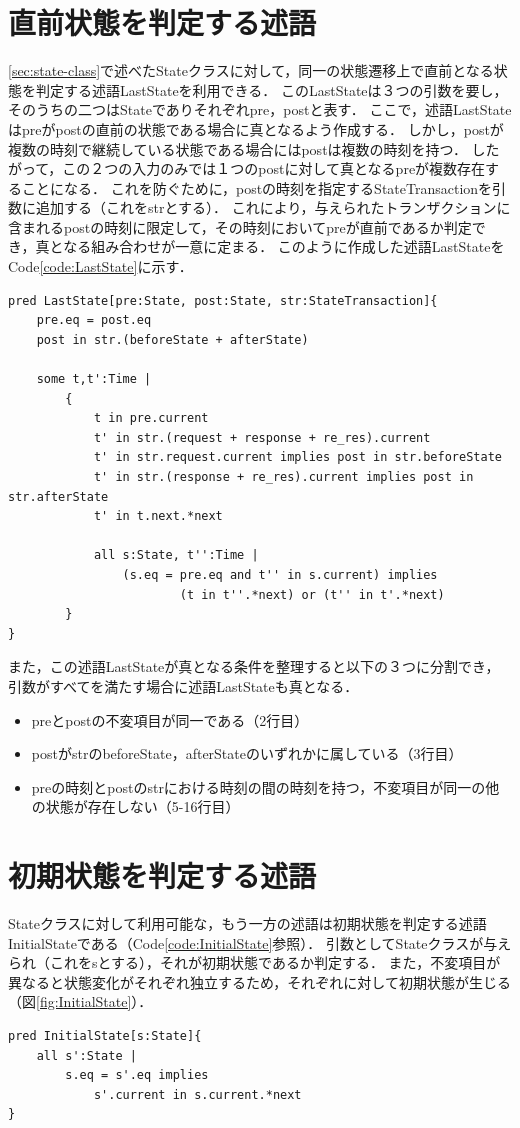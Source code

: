 \documentclass[12pt,a4paper]{jbook}
\begin{document}
\section{直前状態を判定する述語}
\ref{sec:state-class}で述べたStateクラスに対して，同一の状態遷移上で直前となる状態を判定する述語LastStateを利用できる．
このLastStateは３つの引数を要し，そのうちの二つはStateでありそれぞれpre，postと表す．
ここで，述語LastStateはpreがpostの直前の状態である場合に真となるよう作成する．
しかし，postが複数の時刻で継続している状態である場合にはpostは複数の時刻を持つ．
したがって，この２つの入力のみでは１つのpostに対して真となるpreが複数存在することになる．
これを防ぐために，postの時刻を指定するStateTransactionを引数に追加する（これをstrとする）．
これにより，与えられたトランザクションに含まれるpostの時刻に限定して，その時刻においてpreが直前であるか判定でき，真となる組み合わせが一意に定まる．
このように作成した述語LastStateをCode\ref{code:LastState}に示す．

\begin{lstlisting}[caption=状態遷移において直前の状態を判定する述語, label=code:LastState]
pred LastState[pre:State, post:State, str:StateTransaction]{
	pre.eq = post.eq
	post in str.(beforeState + afterState)

	some t,t':Time |
		{
			t in pre.current
			t' in str.(request + response + re_res).current
			t' in str.request.current implies post in str.beforeState
			t' in str.(response + re_res).current implies post in str.afterState
			t' in t.next.*next

			all s:State, t'':Time |
				(s.eq = pre.eq and t'' in s.current) implies
						(t in t''.*next) or (t'' in t'.*next)
		}
}
\end{lstlisting}

また，この述語LastStateが真となる条件を整理すると以下の３つに分割でき，引数がすべてを満たす場合に述語LastStateも真となる．
\begin{itemize}
\item preとpostの不変項目が同一である（2行目）
\item postがstrのbeforeState，afterStateのいずれかに属している（3行目）
\item preの時刻とpostのstrにおける時刻の間の時刻を持つ，不変項目が同一の他の状態が存在しない（5-16行目）
\end{itemize}

\section{初期状態を判定する述語}
Stateクラスに対して利用可能な，もう一方の述語は初期状態を判定する述語InitialStateである（Code\ref{code:InitialState}参照）．
引数としてStateクラスが与えられ（これをsとする），それが初期状態であるか判定する．
また，不変項目が異なると状態変化がそれぞれ独立するため，それぞれに対して初期状態が生じる（図\ref{fig:InitialState}）．
\begin{lstlisting}[caption=状態遷移において初期状態を判定する述語, label=code:InitialState]
pred InitialState[s:State]{
	all s':State |
		s.eq = s'.eq implies
			s'.current in s.current.*next
}
\end{lstlisting}
\end{document}
